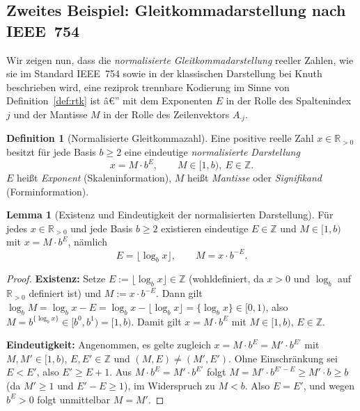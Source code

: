 ﻿\documentclass[a4paper,12pt]{article}
\theoremstyle{definition}
\newtheorem{definition}{Definition}
\newtheorem{lemma}{Lemma}
\begin{document}
\subsection{Zweites Beispiel: Gleitkommadarstellung nach IEEE~754}
\label{subsec:ieee754}

Wir zeigen nun, dass die \emph{normalisierte Gleitkommadarstellung} reeller
Zahlen, wie sie im Standard IEEE~754 \cite{ieee754} sowie in der klassischen
Darstellung bei Knuth \cite{knuth1997} beschrieben wird, eine reziprok
trennbare Kodierung im Sinne von Definition~\ref{def:rtk} ist â€” mit dem
Exponenten $E$ in der Rolle des Spaltenindex $j$ und der Mantisse $M$ in der
Rolle des Zeilenvektors $A_{\cdot j}$.

\begin{definition}[Normalisierte Gleitkommazahl]
\label{def:floatdarstellung}
	Eine positive reelle Zahl $x\in\mathbb{R}_{>0}$ besitzt für jede Basis
	$b\geq2$ eine eindeutige \emph{normalisierte Darstellung}
	\[
		x = M \cdot b^{E}, \qquad M\in[1,b),\ E\in\mathbb{Z}.
	\]
	$E$ heißt \emph{Exponent} (Skaleninformation), $M$ heißt
	\emph{Mantisse} oder \emph{Signifikand} (Forminformation).
\end{definition}

\begin{lemma}[Existenz und Eindeutigkeit der normalisierten Darstellung]
\label{lem:floatexistenz}
	Für jedes $x\in\mathbb{R}_{>0}$ und jede Basis $b\geq2$ existieren
	eindeutige $E\in\mathbb{Z}$ und $M\in[1,b)$ mit $x=M\cdot b^E$, nämlich
	\[
		E = \lfloor \log_b x \rfloor, \qquad M = x\cdot b^{-E}.
	\]
\end{lemma}

\begin{proof}
	\textbf{Existenz:} Setze $E:=\lfloor\log_b x\rfloor\in\mathbb{Z}$ (wohldefiniert,
	da $x>0$ und $\log_b$ auf $\mathbb{R}_{>0}$ definiert ist) und
	$M:=x\cdot b^{-E}$. Dann gilt
	$\log_b M = \log_b x - E = \log_b x - \lfloor\log_b x\rfloor = \{\log_b x\}\in[0,1)$,
	also $M = b^{\{\log_b x\}}\in[b^0,b^1)=[1,b)$. Damit gilt $x=M\cdot b^E$
	mit $M\in[1,b)$, $E\in\mathbb{Z}$.

	\textbf{Eindeutigkeit:} Angenommen, es gelte zugleich
	$x=M\cdot b^E=M'\cdot b^{E'}$ mit $M,M'\in[1,b)$, $E,E'\in\mathbb{Z}$
	und $(M,E)\neq(M',E')$. Ohne Einschränkung sei $E<E'$, also $E'\geq E+1$.
	Aus $M\cdot b^E=M'\cdot b^{E'}$ folgt $M = M'\cdot b^{E'-E}\geq M'\cdot b\geq b$
	(da $M'\geq1$ und $E'-E\geq1$), im Widerspruch zu $M<b$. Also $E=E'$, und
	wegen $b^E>0$ folgt unmittelbar $M=M'$. \qedhere
\end{proof}
\end{document}
